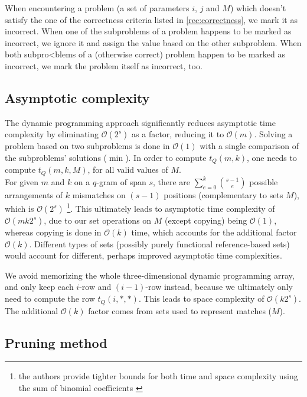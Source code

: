 \documentclass[paper=a4, fontsize=11pt]{scrartcl} %
\numberwithin{equation}{section} %
\numberwithin{figure}{section} %
\numberwithin{table}{section} %
\begin{document}
When encountering a problem (a set of parameters $i$, $j$ and $M$) which doesn't satisfy the one of the correctness criteria listed in \ref{rec:correctness}, we mark it as incorrect. When one of the subproblems of a problem happens to be marked as incorrect, we ignore it and assign the value based on the other subproblem. When both subpro<blems of a (otherwise correct) problem happen to be marked as incorrect, we mark the problem itself as incorrect, too. \\

\subsection{Asymptotic complexity}
\label{subsec:complexity}
The dynamic programming approach significantly reduces asymptotic time complexity by eliminating $\mathcal{O}(2^s)$ as a factor, reducing it to $\mathcal{O}(m)$.
Solving a problem based on two subproblems is done in $\mathcal{O}(1)$ with a single comparison of the subproblems' solutions ($\min$). 
In order to compute $t_Q(m, k)$, one needs to compute $t_Q(m, k, M)$, for all valid values of $M$. \\

For given $m$ and $k$ on a $q$-gram of span $s$, there are $\sum_{e = 0}^k {s - 1 \choose e}$ possible arrangements of $k$ mismatches on $(s - 1)$ positions (complementary to sets $M$), which is $\mathcal{O}(2^s)$ \footnote{the authors provide tighter bounds for both time and space complexity using the sum of binomial coefficients \cite{njihovPaper}}. This ultimately leads to asymptotic time complexity of $\mathcal{O}(mk2^s)$, due to our set operations on $M$ (except copying) being $\mathcal{O}(1)$, whereas copying is done in $\mathcal{O}(k)$ time, which accounts for the additional factor $\mathcal{O}(k)$. Different types of sets (possibly purely functional reference-based sets) would account for different, perhaps improved asymptotic time complexities. 

We avoid memorizing the whole three-dimensional dynamic programming array, and only keep each $i$-row and $(i - 1)$-row instead, because we ultimately only need to compute the row $t_Q(i, *, *)$. This leads to space complexity of $\mathcal{O}(k2^s)$. The additional $\mathcal{O}(k)$ factor comes from sets used to represent matches ($M$).  



\subsection{Pruning method}
\label{subsec:pruning}
\end{document}
